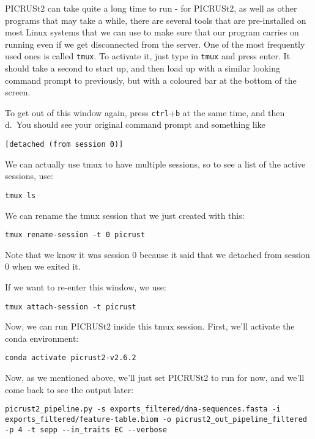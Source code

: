 \documentclass[
]{book}
\begin{document}
PICRUSt2 can take quite a long time to run - for PICRUSt2, as well as other programs that may take a while, there are several tools that are pre-installed on most Linux systems that we can use to make sure that our program carries on running even if we get disconnected from the server. One of the most frequently used ones is called \texttt{tmux}. To activate it, just type in \texttt{tmux} and press enter. It should take a second to start up, and then load up with a similar looking command prompt to previously, but with a coloured bar at the bottom of the screen.

To get out of this window again, press \texttt{ctrl}+\texttt{b} at the same time, and then d.~You should see your original command prompt and something like

\begin{verbatim}
[detached (from session 0)]
\end{verbatim}

We can actually use tmux to have multiple sessions, so to see a list of the active sessions, use:

\begin{verbatim}
tmux ls
\end{verbatim}

We can rename the tmux session that we just created with this:

\begin{verbatim}
tmux rename-session -t 0 picrust
\end{verbatim}

Note that we know it was session 0 because it said that we detached from session 0 when we exited it.

If we want to re-enter this window, we use:

\begin{verbatim}
tmux attach-session -t picrust
\end{verbatim}

Now, we can run PICRUSt2 inside this tmux session. First, we'll activate the conda environment:

\begin{verbatim}
conda activate picrust2-v2.6.2
\end{verbatim}

Now, as we mentioned above, we'll just set PICRUSt2 to run for now, and we'll come back to see the output later:

\begin{verbatim}
picrust2_pipeline.py -s exports_filtered/dna-sequences.fasta -i exports_filtered/feature-table.biom -o picrust2_out_pipeline_filtered -p 4 -t sepp --in_traits EC --verbose
\end{verbatim}
\end{document}
